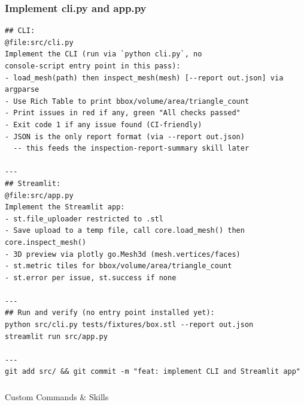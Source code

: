 \begin{frame}[fragile]\frametitle{Implement cli.py and app.py}
\begin{lstlisting}
## CLI:
@file:src/cli.py
Implement the CLI (run via `python cli.py`, no
console-script entry point in this pass):
- load_mesh(path) then inspect_mesh(mesh) [--report out.json] via argparse
- Use Rich Table to print bbox/volume/area/triangle_count
- Print issues in red if any, green "All checks passed"
- Exit code 1 if any issue found (CI-friendly)
- JSON is the only report format (via --report out.json)
  -- this feeds the inspection-report-summary skill later

---
## Streamlit:
@file:src/app.py
Implement the Streamlit app:
- st.file_uploader restricted to .stl
- Save upload to a temp file, call core.load_mesh() then core.inspect_mesh()
- 3D preview via plotly go.Mesh3d (mesh.vertices/faces)
- st.metric tiles for bbox/volume/area/triangle_count
- st.error per issue, st.success if none

---
## Run and verify (no entry point installed yet):
python src/cli.py tests/fixtures/box.stl --report out.json
streamlit run src/app.py

---
git add src/ && git commit -m "feat: implement CLI and Streamlit app"
\end{lstlisting}
\end{frame}


\begin{frame}[fragile]\frametitle{}
\begin{center}
{\Large Custom Commands \& Skills}
\end{center}
\end{frame}


